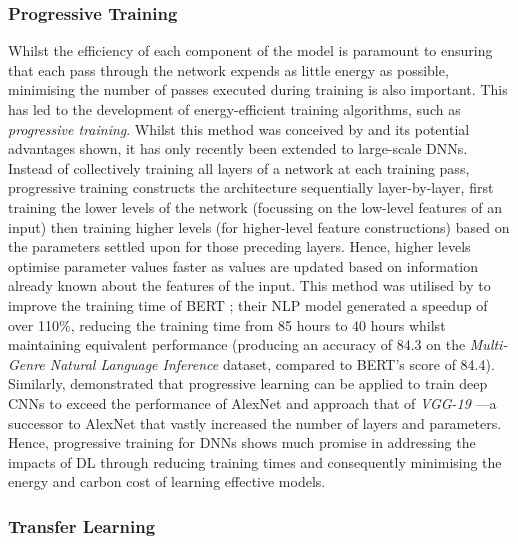 \documentclass[a4paper, 12pt]{article}
\begin{document}
    \subsubsection{Progressive Training}

    Whilst the efficiency of each component of the model is paramount to ensuring that each pass through the network expends as little energy as possible, minimising the number of passes executed during training is also important. This has led to the development of energy-efficient training algorithms, such as \emph{progressive training}. Whilst this method was conceived by \citet{akhand-2008} and its potential advantages shown, it has only recently been extended to large-scale DNNs. Instead of collectively training all layers of a network at each training pass, progressive training constructs the architecture sequentially layer-by-layer, first training the lower levels of the network (focussing on the low-level features of an input) then training higher levels (for higher-level feature constructions) based on the parameters settled upon for those preceding layers. Hence, higher levels optimise parameter values faster as values are updated based on information already known about the features of the input. This method was utilised by \citet{yang-2020} to improve the training time of BERT \citep{devlin-2019}; their NLP model generated a speedup of over 110\%, reducing the training time from 85 hours to 40 hours whilst maintaining equivalent performance (producing an accuracy of 84.3 on the \emph{Multi-Genre Natural Language Inference} dataset, compared to BERT's score of 84.4). Similarly, \citet{belilovsky-2018} demonstrated that progressive learning can be applied to train deep CNNs to exceed the performance of AlexNet and approach that of \emph{VGG-19} \citep{simonyan-2014}---a successor to AlexNet that vastly increased the number of layers and parameters. Hence, progressive training for DNNs shows much promise in addressing the impacts of DL through reducing training times and consequently minimising the energy and carbon cost of learning effective models.

    \subsubsection{Transfer Learning}
\end{document}
